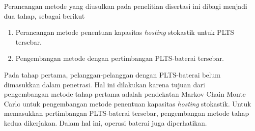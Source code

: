 Perancangan metode yang diusulkan pada penelitian disertasi ini dibagi menjadi dua tahap, sebagai berikut
\begin{enumerate}
	\item Perancangan metode penentuan kapasitas \textit{\textit{hosting}} stokastik untuk PLTS tersebar.
	\item Pengembangan metode dengan pertimbangan PLTS-baterai tersebar.
\end{enumerate}

Pada tahap pertama, pelanggan-pelanggan dengan PLTS-baterai belum dimasukkan dalam penetrasi. Hal ini dilakukan karena tujuan dari pengembangan metode tahap pertama adalah pendekatan Markov Chain Monte Carlo untuk pengembangan metode penentuan kapasitas \textit{\textit{hosting}} stokastik. Untuk memasukkan pertimbangan PLTS-baterai tersebar, pengembangan metode tahap kedua dikerjakan. Dalam hal ini, operasi baterai juga diperhatikan.

